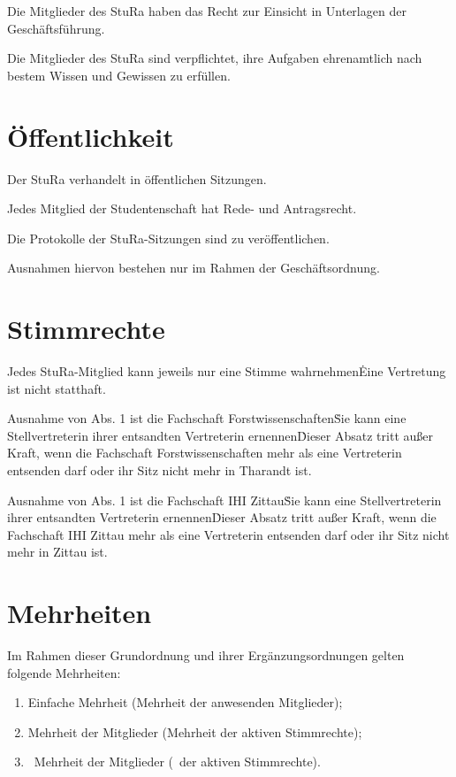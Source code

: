 \begin{multicols}{2}
\Abs \Satz Die Mitglieder des StuRa haben das Recht zur Einsicht in Unterlagen der Geschäftsführung.

\Abs \Satz Die Mitglieder des StuRa sind verpflichtet, ihre Aufgaben ehrenamtlich nach bestem Wissen und Gewissen zu erfüllen.



\section{Öffentlichkeit}

\Abs \Satz Der StuRa verhandelt in öffentlichen Sitzungen.

\Abs \Satz Jedes Mitglied der Studentenschaft hat Rede- und Antragsrecht.

\Abs \Satz Die Protokolle der StuRa-Sitzungen sind zu veröffentlichen.

\Abs \Satz Ausnahmen hiervon bestehen nur im Rahmen der Geschäftsordnung.



\section{Stimmrechte}

\Abs \Satz Jedes StuRa-Mitglied kann jeweils nur eine Stimme wahrnehmen\. Eine Vertretung ist nicht statthaft.

\Abs \Satz Ausnahme von Abs. 1 ist die Fachschaft Forstwissenschaften\. Sie kann eine Stellvertreterin ihrer entsandten Vertreterin ernennen\. Dieser Absatz tritt außer Kraft, wenn die Fachschaft Forstwissenschaften mehr als eine Vertreterin entsenden darf oder ihr Sitz nicht mehr in Tharandt ist.

\Abs \Satz Ausnahme von Abs. 1 ist die Fachschaft IHI Zittau\. Sie kann eine Stellvertreterin ihrer entsandten Vertreterin ernennen\. Dieser Absatz tritt außer Kraft, wenn die Fachschaft IHI Zittau mehr als eine Vertreterin entsenden darf oder ihr Sitz nicht mehr in Zittau ist.


\section{Mehrheiten}

\Abs \Satz Im Rahmen dieser Grundordnung und ihrer Ergänzungsordnungen gelten folgende Mehrheiten:
\begin{enumerate}
\item Einfache Mehrheit (Mehrheit der anwesenden Mitglieder);
\item Mehrheit der Mitglieder (Mehrheit der aktiven Stimmrechte);
\item {}~Mehrheit der Mitglieder (~der aktiven Stimmrechte).
\end{enumerate}


\end{multicols}
